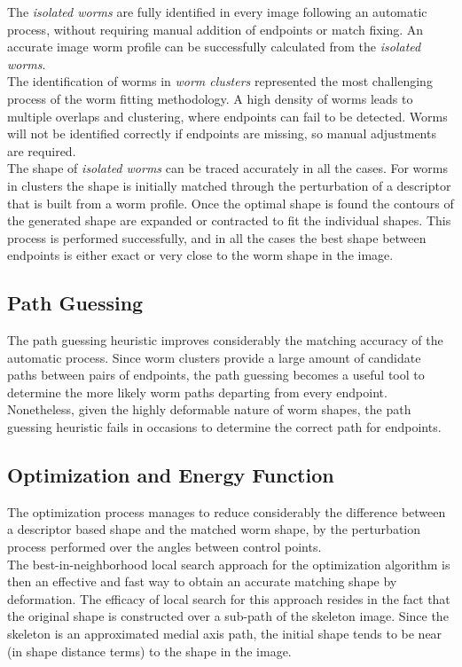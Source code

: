 The \emph{isolated worms} are fully identified in every image following
an automatic process, without requiring manual addition of endpoints
or match fixing. An accurate image worm profile can be successfully 
calculated from the \emph{isolated worms}.\\
The identification of worms in \emph{worm clusters} represented the most 
challenging process of the worm fitting methodology. A high density
of worms leads to multiple overlaps and clustering, where endpoints can fail
to be detected. Worms will not be identified correctly if endpoints are
missing, so manual adjustments are required.\\
The shape of \emph{isolated worms} can be traced accurately in all the cases.
For worms in clusters the shape is initially matched through the perturbation
of a descriptor that is built from a worm profile. Once the optimal shape
is found the contours of the generated shape are expanded or contracted
to fit the individual shapes. This process is performed successfully, and in
all the cases the best shape between endpoints is either exact or very close
to the worm shape in the image.

\subsection*{Path Guessing}

The path guessing heuristic improves considerably the matching accuracy
of the automatic process. Since worm clusters provide a large amount of 
candidate paths between pairs of endpoints, the path guessing
becomes a useful tool to determine the more likely worm paths departing
from every endpoint. Nonetheless, given the highly deformable nature
of worm shapes, the path guessing heuristic fails in occasions to determine
the correct path for endpoints.

\subsection*{Optimization and Energy Function}
The optimization process manages to reduce considerably the difference
between a descriptor based shape
and the matched worm shape, by the perturbation process performed over
the angles between control points. \\
The best-in-neighborhood local search approach for the optimization algorithm
is then an effective and fast way to obtain an accurate matching
shape by deformation. The efficacy of local search for this approach resides
in the fact that the original shape is constructed over a sub-path of the
skeleton image. Since the skeleton is an approximated medial axis path, 
the initial shape tends to be near (in shape distance terms) to the shape 
in the image.\\

